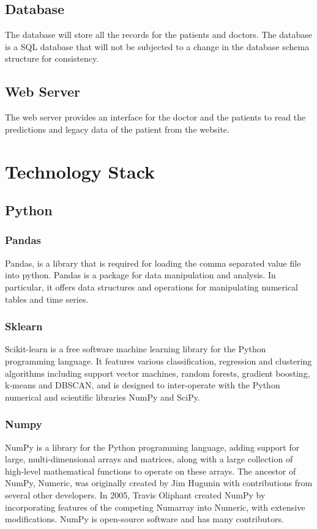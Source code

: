 \documentclass[12pt]{article}
\begin{document}
\subsection{Database}
The database will store all the records for the patients and doctors. The database is a SQL database that will not be subjected to a change in the database schema structure for consistency.

\subsection{Web Server}
The web server provides an interface for the doctor and the patients to read the predictions and legacy data of the patient from the website.

\newpage
\section{Technology Stack}
\subsection{Python}
\subsubsection{Pandas}
Pandas, is a library that is required for loading the comma separated value file into python. Pandas is a package for data manipulation and analysis. In particular, it offers data structures and operations for manipulating numerical tables and time series.

\subsubsection{Sklearn}
Scikit-learn is a free software machine learning library for the Python programming language. It features various classification, regression and clustering algorithms including support vector machines, random forests, gradient boosting, k-means and DBSCAN, and is designed to inter-operate with the Python numerical and scientific libraries NumPy and SciPy.

\subsubsection{Numpy}
NumPy is a library for the Python programming language, adding support for large, multi-dimensional arrays and matrices, along with a large collection of high-level mathematical functions to operate on these arrays. The ancestor of NumPy, Numeric, was originally created by Jim Hugunin with contributions from several other developers. In 2005, Travis Oliphant created NumPy by incorporating features of the competing Numarray into Numeric, with extensive modifications. NumPy is open-source software and has many contributors.
\end{document}
